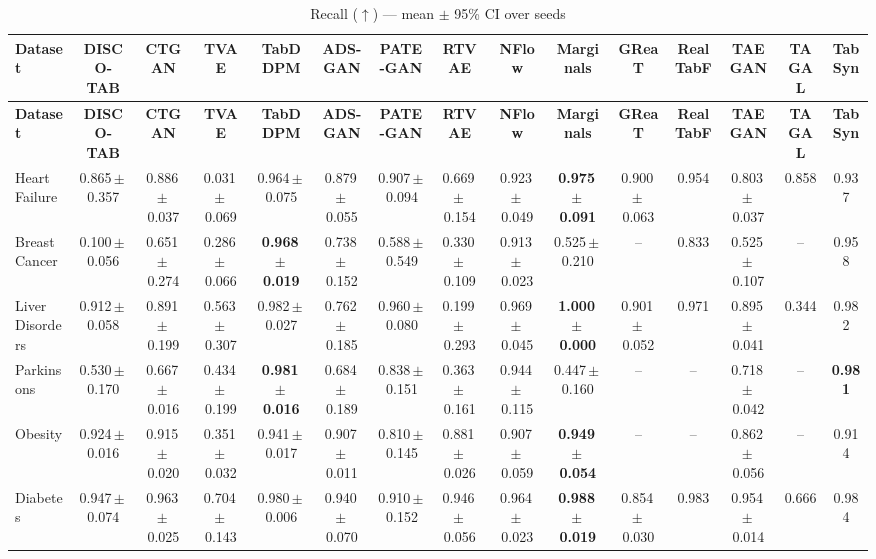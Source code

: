 \documentclass[8pt]{extarticle}
\begin{document}
\begin{longtable}{l*{14}{c}}
\caption{Recall ($\uparrow$) --- mean $\pm$ 95\% CI over seeds}\\
\toprule
\textbf{Dataset} & \textbf{DISCO-TAB} & \textbf{CTGAN} & \textbf{TVAE} & \textbf{TabDDPM} & \textbf{ADS-GAN} & \textbf{PATE-GAN} & \textbf{RTVAE} & \textbf{NFlow} & \textbf{Marginals} & \textbf{GReaT} & \textbf{RealTabF} & \textbf{TAEGAN} & \textbf{TAGAL} & \textbf{TabSyn} \\
\midrule
\endfirsthead
\toprule
\textbf{Dataset} & \textbf{DISCO-TAB} & \textbf{CTGAN} & \textbf{TVAE} & \textbf{TabDDPM} & \textbf{ADS-GAN} & \textbf{PATE-GAN} & \textbf{RTVAE} & \textbf{NFlow} & \textbf{Marginals} & \textbf{GReaT} & \textbf{RealTabF} & \textbf{TAEGAN} & \textbf{TAGAL} & \textbf{TabSyn} \\
\midrule
\endhead
\bottomrule
\endfoot
Heart Failure & 0.865\,$\pm$\,0.357 & 0.886\,$\pm$\,0.037 & 0.031\,$\pm$\,0.069 & 0.964\,$\pm$\,0.075 & 0.879\,$\pm$\,0.055 & 0.907\,$\pm$\,0.094 & 0.669\,$\pm$\,0.154 & 0.923\,$\pm$\,0.049 & \textbf{0.975\,$\pm$\,0.091} & 0.900\,$\pm$\,0.063 & 0.954 & 0.803\,$\pm$\,0.037 & 0.858 & 0.937 \\
Breast Cancer & 0.100\,$\pm$\,0.056 & 0.651\,$\pm$\,0.274 & 0.286\,$\pm$\,0.066 & \textbf{0.968\,$\pm$\,0.019} & 0.738\,$\pm$\,0.152 & 0.588\,$\pm$\,0.549 & 0.330\,$\pm$\,0.109 & 0.913\,$\pm$\,0.023 & 0.525\,$\pm$\,0.210 & -- & 0.833 & 0.525\,$\pm$\,0.107 & -- & 0.958 \\
Liver Disorders & 0.912\,$\pm$\,0.058 & 0.891\,$\pm$\,0.199 & 0.563\,$\pm$\,0.307 & 0.982\,$\pm$\,0.027 & 0.762\,$\pm$\,0.185 & 0.960\,$\pm$\,0.080 & 0.199\,$\pm$\,0.293 & 0.969\,$\pm$\,0.045 & \textbf{1.000\,$\pm$\,0.000} & 0.901\,$\pm$\,0.052 & 0.971 & 0.895\,$\pm$\,0.041 & 0.344 & 0.982 \\
Parkinsons & 0.530\,$\pm$\,0.170 & 0.667\,$\pm$\,0.016 & 0.434\,$\pm$\,0.199 & \textbf{0.981\,$\pm$\,0.016} & 0.684\,$\pm$\,0.189 & 0.838\,$\pm$\,0.151 & 0.363\,$\pm$\,0.161 & 0.944\,$\pm$\,0.115 & 0.447\,$\pm$\,0.160 & -- & -- & 0.718\,$\pm$\,0.042 & -- & \textbf{0.981} \\
Obesity & 0.924\,$\pm$\,0.016 & 0.915\,$\pm$\,0.020 & 0.351\,$\pm$\,0.032 & 0.941\,$\pm$\,0.017 & 0.907\,$\pm$\,0.011 & 0.810\,$\pm$\,0.145 & 0.881\,$\pm$\,0.026 & 0.907\,$\pm$\,0.059 & \textbf{0.949\,$\pm$\,0.054} & -- & -- & 0.862\,$\pm$\,0.056 & -- & 0.914 \\
Diabetes & 0.947\,$\pm$\,0.074 & 0.963\,$\pm$\,0.025 & 0.704\,$\pm$\,0.143 & 0.980\,$\pm$\,0.006 & 0.940\,$\pm$\,0.070 & 0.910\,$\pm$\,0.152 & 0.946\,$\pm$\,0.056 & 0.964\,$\pm$\,0.023 & \textbf{0.988\,$\pm$\,0.019} & 0.854\,$\pm$\,0.030 & 0.983 & 0.954\,$\pm$\,0.014 & 0.666 & 0.984 \\

\end{longtable}
\end{document}

